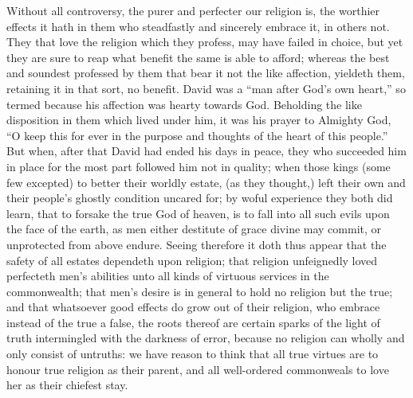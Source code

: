 Without all controversy, the purer and perfecter our religion is, the worthier effects it hath in them who steadfastly and sincerely embrace it, in others not. They that love the religion which they profess, may have failed in choice, but yet they are sure to reap what benefit the same is able to afford; whereas the best and soundest professed by them that bear it not the like affection, yieldeth them, retaining it in that sort, no benefit. David was a “man after God’s own heart,” so termed because his affection was hearty towards God. Beholding the like disposition in them which lived under him, it was his prayer to Almighty God, “O keep this for ever in the purpose and thoughts of the heart of this people.” But when, after that David had ended his days in peace, they who succeeded him in place for the most part followed him not in quality; when those kings (some few excepted) to better their worldly estate, (as they thought,) left their own and their people’s ghostly condition uncared for; by woful experience they both did learn, that to forsake the true God of heaven, is to fall into all such evils upon the face of the earth, as men either destitute of grace divine may commit, or unprotected from above endure.
Seeing therefore it doth thus appear that the safety of all estates dependeth upon religion; that religion unfeignedly loved perfecteth men’s abilities unto all kinds of virtuous services in the commonwealth; that men’s desire is in general to  hold no religion but the true; and that whatsoever good effects do grow out of their religion, who embrace instead of the true a false, the roots thereof are certain sparks of the light of truth intermingled with the darkness of error, because no religion can wholly and only consist of untruths: we have reason to think that all true virtues are to honour true religion as their parent, and all well-ordered commonweals to love her as their chiefest stay.

